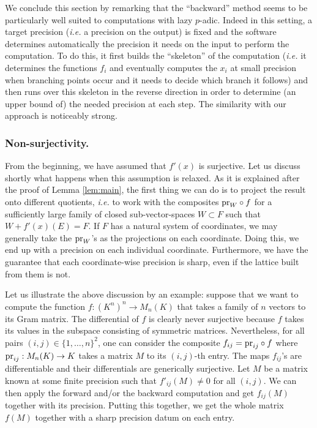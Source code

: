 \documentclass{lms}
\begin{document}
We conclude this section by remarking that the ``backward'' method seems 
to be particularly well suited to computations with lazy $p$-adic. Indeed 
in this setting, a target precision (\emph{i.e.} a precision on the 
output) is fixed and the software determines automatically the precision 
it needs on the input to perform the computation. To do this, it first 
builds the ``skeleton'' of the computation (\emph{i.e.} it determines the 
functions $f_i$ and eventually computes the $x_i$ at small precision when 
branching points occur and it needs to decide which branch it follows) 
and then runs over this skeleton in the reverse direction in order to 
determine (an upper bound of) the needed precision at each step. The 
similarity with our approach is noticeably strong.

\subsubsection*{Non-surjectivity.}

From the beginning, we have assumed that $f'(x)$ is surjective. Let us 
discuss shortly what happens when this assumption is relaxed. As it is 
explained after the proof of Lemma \ref{lem:main}, the first thing we 
can do is to project the result onto different quotients, \emph{i.e.} to 
work with the composites $\text{\rm pr}_W \circ f$ for a sufficiently large family 
of closed sub-vector-spaces $W \subset F$ such that $W + f'(x)(E) = F$. 
If $F$ has a natural system of coordinates, we may generally take the 
$\text{\rm pr}_W$'s as the projections on each coordinate. Doing this, we end up 
with a precision on each individual coordinate. Furthermore, we have the 
guarantee that each coordinate-wise precision is sharp, even if the lattice built
from them is not.

Let us illustrate the above discussion by an example: suppose that we 
want to compute the function $f : (K^n)^n \to M_n(K)$ that takes a 
family of $n$ vectors to its Gram matrix. The differential of $f$ is
clearly never surjective because $f$ takes its values in the subspace
consisting of symmetric matrices. Nevertheless, for all pairs $(i,j)
\in \{1, \ldots, n\}^2$, one can consider the composite $f_{ij} = 
\text{\rm pr}_{ij} \circ f$ where $\text{\rm pr}_{ij} : M_n(K) \to K$ takes a matrix 
$M$ to its $(i,j)$-th entry. The maps $f_{ij}$'s are differentiable and 
their differentials are generically surjective. Let $M$ be a matrix known
at some finite precision such that 
$f'_{ij} (M) \neq 0$ for all $(i,j)$. We can then apply the forward 
and/or the backward computation and get $f_{ij}(M)$ together with its 
precision. Putting this together, we get the whole matrix $f(M)$ 
together with a sharp precision datum on each entry.
\end{document}
